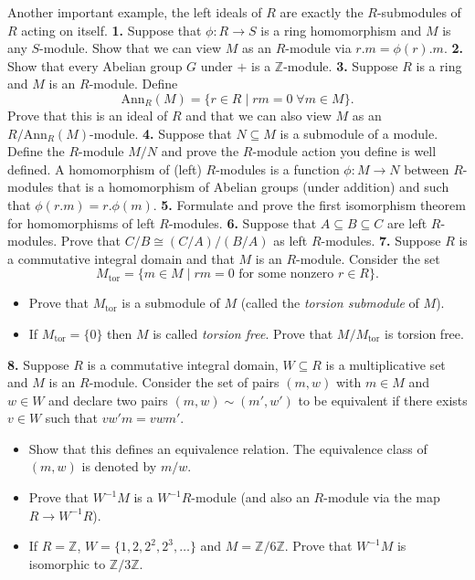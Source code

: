 \documentclass[11pt]{amsart}
\theoremstyle{theorem}
\renewcommand{\to}[1][]{\xrightarrow{\ #1\ }}
\newcommand{\bZ}{\mathbb{Z}}
\newcommand{\Ann}{\mathrm{Ann}}
\newcommand{\tor}{\mathrm{tor}}
\begin{document}
Another important example, the left ideals of $R$ are exactly the $R$-submodules of $R$ acting on itself.
\vskip 9pt
\noindent
{\bf 1.}  Suppose that $\phi : R \to S$ is a ring homomorphism and $M$ is any $S$-module.  Show that we can view $M$ as an $R$-module via $r.m = \phi(r).m$.
\newpage
\noindent
{\bf 2.}  Show that every Abelian group $G$ under $+$ is a $\bZ$-module.
\newpage
\noindent
{\bf 3.}  Suppose $R$ is a ring and $M$ is an $R$-module.  Define
\[
    \Ann_R(M) = \{r \in R\;|\; rm = 0 \;\forall m \in M \}.
\]
Prove that this is an ideal of $R$ and that we can also view $M$ as an $R/\Ann_R(M)$-module.
\newpage
\noindent
{\bf 4.}  Suppose that $N \subseteq M$ is a submodule of a module.  Define the $R$-module $M/N$ and prove the $R$-module action you define is well defined.
\newpage
\noindent
A homomorphism of (left) $R$-modules is a function $\phi : M \to N$ between $R$-modules that is a homomorphism of Abelian groups (under addition) and such that $\phi(r.m) = r.\phi(m)$.
\vskip 9pt
\noindent
{\bf 5.}  Formulate and prove the first isomorphism theorem for homomorphisms of left $R$-modules.
\newpage
\noindent
{\bf 6.}  Suppose that $A \subseteq B \subseteq C$ are left $R$-modules.  Prove that $C/B \cong (C/A)/(B/A)$ as left $R$-modules.
\newpage
\noindent
{\bf 7.}  Suppose $R$ is a commutative integral domain and that $M$ is an $R$-module.  Consider the set
\[
    M_{\tor} = \{m \in M \;|\; rm = 0 \text{ for some nonzero } r\in R\}.
\]
\begin{itemize}
    \item[(a)]  Prove that $M_{\tor}$ is a submodule of $M$ (called the \emph{torsion submodule} of $M$).
    \item[(b)]  If $M_{\tor} = \{0\}$ then $M$ is called \emph{torsion free}.  Prove that $M/M_{\tor}$ is torsion free.
\end{itemize}
\newpage
\noindent
{\bf 8.}  Suppose $R$ is a commutative integral domain, $W \subseteq R$ is a multiplicative set and $M$ is an $R$-module.
Consider the set of pairs $(m, w)$ with $m \in M$ and $w \in W$ and declare two pairs $(m, w) \sim (m', w')$ to be equivalent if there exists $v \in W$ such that $v w' m = v w m'$.
\begin{itemize}
    \item[(a)]  Show that this defines an equivalence relation.  The equivalence class of $(m,w)$ is denoted by $m/w$.
    \item[(b)]  Prove that $W^{-1} M$ is a $W^{-1}R$-module (and also an $R$-module via the map $R \to W^{-1}R$).
    \item[(c)]  If $R = \bZ$, $W = \{1, 2, 2^2, 2^3, \dots\}$ and $M = \bZ/6\bZ$.  Prove that $W^{-1} M$ is isomorphic to $\bZ/3\bZ$.
\end{itemize}
\end{document}
